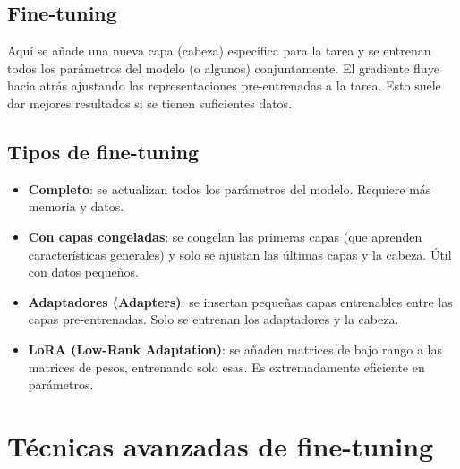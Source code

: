 \documentclass[12pt,a4paper,openany,oneside]{book}
\begin{document}
\subsection{Fine-tuning}
Aquí se añade una nueva capa (cabeza) específica para la tarea y se entrenan todos los parámetros del modelo (o algunos) conjuntamente. El gradiente fluye hacia atrás ajustando las representaciones pre-entrenadas a la tarea. Esto suele dar mejores resultados si se tienen suficientes datos.

\begin{center}
\caption{Fine-tuning: el gradiente ajusta los pesos de BERT y la cabeza.}
\end{center}

\subsection{Tipos de fine-tuning}
\begin{itemize}
    \item \textbf{Completo}: se actualizan todos los parámetros del modelo. Requiere más memoria y datos.
    \item \textbf{Con capas congeladas}: se congelan las primeras capas (que aprenden características generales) y solo se ajustan las últimas capas y la cabeza. Útil con datos pequeños.
    \item \textbf{Adaptadores (Adapters)}: se insertan pequeñas capas entrenables entre las capas pre-entrenadas. Solo se entrenan los adaptadores y la cabeza.
    \item \textbf{LoRA (Low-Rank Adaptation)}: se añaden matrices de bajo rango a las matrices de pesos, entrenando solo esas. Es extremadamente eficiente en parámetros.
\end{itemize}

\section{Técnicas avanzadas de fine-tuning}
\end{document}

